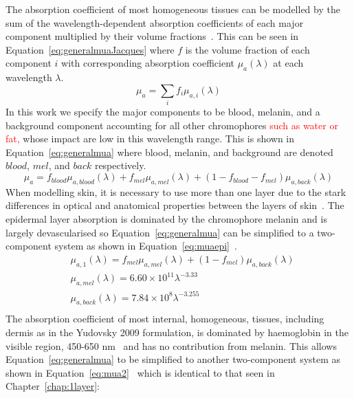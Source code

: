 The absorption coefficient of most homogeneous tissues can be modelled by the sum of the wavelength-dependent absorption coefficients of each major component multiplied by their volume fractions~\citep{Jacques2013}. 
This can be seen in Equation~\eqref{eq:generalmuaJacques} where $f$ is the volume fraction of each component $i$ with corresponding absorption coefficient $\mu_a(\lambda)$ at each wavelength $\lambda$. 
\begin{equation}
    \mu_a = \sum_i{f_i\mu_{a, i}(\lambda)}
    \label{eq:generalmuaJacques}
\end{equation}
In this work we specify the major components to be blood, melanin, and a background component accounting for all other chromophores \textcolor{red}{such as water or fat,} whose impact are low in this wavelength range. This is shown in Equation~\eqref{eq:generalmua} where blood, melanin, and background are denoted $blood$, $mel$, and $back$ respectively.
\begin{equation}
    \mu_a = f_{blood}\mu_{a, blood}(\lambda) + f_{mel}\mu_{a, mel}(\lambda) + (1 - f_{blood} - f_{mel})\mu_{a, back}(\lambda)
    \label{eq:generalmua}
\end{equation}
When modelling skin, it is necessary to use more than one layer due to the stark differences in optical and anatomical properties between the layers of skin~\citep{Mignon2018}. The epidermal layer absorption is dominated by the chromophore melanin and is largely devascularised so Equation~\eqref{eq:generalmua} can be simplified to a two-component system as shown in Equation~\eqref{eq:muaepi}~\citep{Yudovsky2009}.
\begin{equation}
\begin{aligned}
    & \mu_{a, 1}(\lambda) = f_{mel}\mu_{a, mel}(\lambda) + (1-f_{mel})\mu_{a, back}(\lambda) \\
    & \mu_{a, mel}(\lambda) = 6.60\times10^{11}\lambda^{-3.33}\\
    & \mu_{a, back}(\lambda) = 7.84\times10^8\lambda^{-3.255}\\
\end{aligned}
\label{eq:muaepi}
\end{equation}
The absorption coefficient of most internal, homogeneous, tissues, including dermis as in the Yudovsky 2009 formulation, is dominated by haemoglobin in the visible region, 450-650 nm~\citep{JacquesAbs} and has no contribution from melanin. This allows Equation~\eqref{eq:generalmua} to be simplified to another two-component system as shown in Equation~\eqref{eq:mua2}~\citep{Yudovsky2009} which is identical to that seen in Chapter~\ref{chap:1layer}: 
